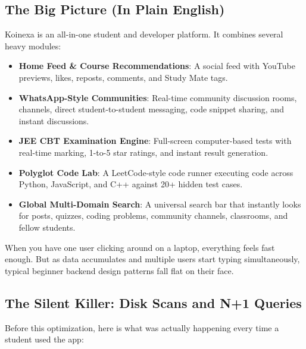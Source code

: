 \documentclass[11pt,a4paper]{article}
\begin{document}
\subsection{The Big Picture (In Plain English)}
Koinexa is an all-in-one student and developer platform. It combines several heavy modules:
\begin{itemize}[leftmargin=1.5cm]
    \item \textbf{Home Feed \& Course Recommendations}: A social feed with YouTube previews, likes, reposts, comments, and Study Mate tags.
    \item \textbf{WhatsApp-Style Communities}: Real-time community discussion rooms, channels, direct student-to-student messaging, code snippet sharing, and instant discussions.
    \item \textbf{JEE CBT Examination Engine}: Full-screen computer-based tests with real-time marking, 1-to-5 star ratings, and instant result generation.
    \item \textbf{Polyglot Code Lab}: A LeetCode-style code runner executing code across Python, JavaScript, and C++ against 20+ hidden test cases.
    \item \textbf{Global Multi-Domain Search}: A universal search bar that instantly looks for posts, quizzes, coding problems, community channels, classrooms, and fellow students.
\end{itemize}

When you have one user clicking around on a laptop, everything feels fast enough. But as data accumulates and multiple users start typing simultaneously, typical beginner backend design patterns fall flat on their face.

\subsection{The Silent Killer: Disk Scans and N+1 Queries}
Before this optimization, here is what was actually happening every time a student used the app:
\end{document}
